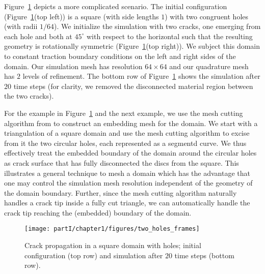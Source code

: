 Figure~\ref{fig:chap1.examples.propagation.two_holes} depicts a more complicated scenario. The initial configuration (Figure~\ref{fig:chap1.examples.propagation.two_holes}\linebreak[0](top left)) is a square (with side lengths $1$) with two congruent holes (with radii $1/64$). We initialize the simulation with two cracks, one emerging from each hole and both at $45^{\circ}$ with respect to the horizontal such that the resulting geometry is rotationally symmetric (Figure~\ref{fig:chap1.examples.propagation.two_holes}(top right)). We subject this domain to constant traction boundary conditions on the left and right sides of the domain. Our simulation mesh has resolution $64 \times 64$ and our quadrature mesh has $2$ levels of refinement. The bottom row of Figure~\ref{fig:chap1.examples.propagation.two_holes} shows the simulation after $20$ time steps (for clarity, we removed the disconnected material region between the two cracks).

For the example in Figure~\ref{fig:chap1.examples.propagation.two_holes} and the next example, we use the mesh cutting algorithm from \cite{Sifakis07} to construct an embedding mesh for the domain. We start with a triangulation of a square domain and use the mesh cutting algorithm to excise from it the two circular holes, each represented as a segmentd curve. We thus effectively treat the embedded boundary of the domain around the circular holes as crack surface that has fully disconnected the discs from the square. This illustrates a general technique to mesh a domain which has the advantage that one may control the simulation mesh resolution independent of the geometry of the domain boundary. Further, since the mesh cutting algorithm naturally handles a crack tip inside a fully cut triangle, we can automatically handle the crack tip reaching the (embedded) boundary of the domain.

\setlength{\figurewidth}{\textwidth}
\begin{figure}[htbp]
\centering
\texttt{[image: partI/chapter1/figures/two\_holes\_frames]}
\caption{Crack propagation in a square domain with holes; initial configuration (top row) and simulation after $20$ time steps (bottom row).}
\label{fig:chap1.examples.propagation.two_holes}
\end{figure}

